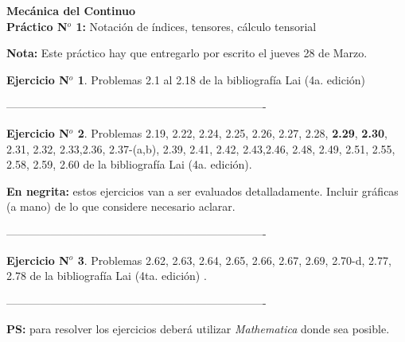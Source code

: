 \documentclass[12pt,a4paper]{article}
\theoremstyle{definition}
\newtheorem{example}{Ejercicio N$^o$}
\begin{document}
\begin{center}
{\textbf{Mecánica del Continuo} \\ 
 \textbf{Práctico N$^o$ 1:} Notación de índices, tensores, cálculo tensorial
}


\end{center}
\noindent \textbf{Nota:} Este práctico hay que entregarlo por escrito el jueves 28 de Marzo.
\medskip



\begin{example}
Problemas 2.1 al 2.18 de la bibliografía Lai (4a. edición)
\end{example}
\begin{center}
----------------------------------------------------------------------
\end{center}


\begin{example}

Problemas 2.19, 2.22, 2.24, 2.25, 2.26, 2.27, 2.28, \textbf{2.29}, \textbf{2.30}, 2.31, 2.32, 2.33,2.36, 2.37-(a,b), 2.39, 2.41, 2.42, 2.43,2.46, 2.48, 2.49, 2.51, 2.55, 2.58, 2.59, 2.60
de la bibliografía Lai (4a. edición). 

\noindent \textbf{En negrita:} estos ejercicios van a ser evaluados detalladamente. Incluir gráficas (a mano) de lo que considere necesario aclarar.

\end{example}
\begin{center}
----------------------------------------------------------------------
\end{center}

\begin{example}
Problemas 2.62, 2.63, 2.64, 2.65, 2.66, 2.67, 2.69, 2.70-d, 2.77, 2.78 de la bibliografía Lai (4ta. edición) .
\end{example}
\begin{center}
----------------------------------------------------------------------
\end{center}

\noindent \textbf{PS:}  para resolver los ejercicios deberá utilizar \textit{Mathematica} donde sea posible.
\end{document}
